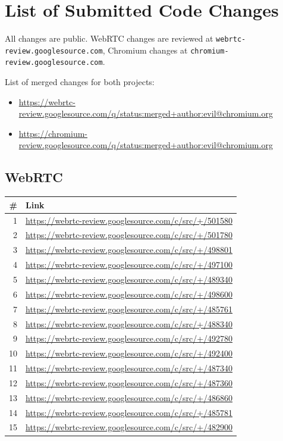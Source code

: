 \documentclass[11pt]{article}
\begin{document}
\section{List of Submitted Code Changes}
\label{app:changes}

All changes are public. WebRTC changes are reviewed at \texttt{webrtc-review.googlesource.com}, Chromium changes at \texttt{chromium-review.googlesource.com}.

List of merged changes for both projects:
\begin{itemize}[nosep]
    \item \url{https://webrtc-review.googlesource.com/q/status:merged+author:evil@chromium.org}
    \item \url{https://chromium-review.googlesource.com/q/status:merged+author:evil@chromium.org}
\end{itemize}

\subsection*{WebRTC}

\begin{longtable}{@{}rl@{}}
\toprule
\textbf{\#} & \textbf{Link} \\
\midrule
\endhead
1  & \url{https://webrtc-review.googlesource.com/c/src/+/501580} \\
2  & \url{https://webrtc-review.googlesource.com/c/src/+/501780} \\
3  & \url{https://webrtc-review.googlesource.com/c/src/+/498801} \\
4  & \url{https://webrtc-review.googlesource.com/c/src/+/497100} \\
5  & \url{https://webrtc-review.googlesource.com/c/src/+/489340} \\
6  & \url{https://webrtc-review.googlesource.com/c/src/+/498600} \\
7  & \url{https://webrtc-review.googlesource.com/c/src/+/485761} \\
8  & \url{https://webrtc-review.googlesource.com/c/src/+/488340} \\
9  & \url{https://webrtc-review.googlesource.com/c/src/+/492780} \\
10 & \url{https://webrtc-review.googlesource.com/c/src/+/492400} \\
11 & \url{https://webrtc-review.googlesource.com/c/src/+/487340} \\
12 & \url{https://webrtc-review.googlesource.com/c/src/+/487360} \\
13 & \url{https://webrtc-review.googlesource.com/c/src/+/486860} \\
14 & \url{https://webrtc-review.googlesource.com/c/src/+/485781} \\
15 & \url{https://webrtc-review.googlesource.com/c/src/+/482900} \\
\bottomrule
\end{longtable}
\end{document}
